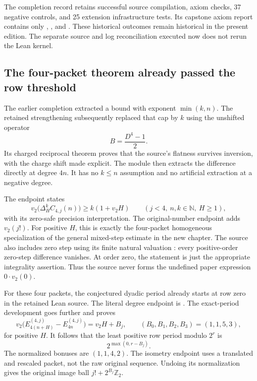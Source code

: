 The completion record retains successful source compilation, axiom checks, 37 negative controls, and 25 extension infrastructure tests. Its capstone axiom report contains only , , and . These historical outcomes remain historical in the present edition. The separate source and log reconciliation executed now does not rerun the Lean kernel.

\subsection{The four-packet theorem already passed the row threshold}
The earlier completion extracted a bound with exponent $\min(k,n)$. The retained strengthening subsequently replaced that cap by $k$ using the unshifted operator
\[
 B=\frac{D^4-1}{2}.
\]
Its charged reciprocal theorem proves that the source's flatness survives inversion, with the charge shift made explicit. The module  then extracts the difference directly at degree $4n$. It has no $k\le n$ assumption and no artificial extraction at a negative degree.

The endpoint  states
\[
 v_2\bigl(\Delta_H^k C_{4,j}(n)\bigr)\ge k(1+v_2H)
 \qquad(j<4,\ n,k\in\mathbb N,\ H\ge1),
\]
with its zero-safe precision interpretation. The original-number endpoint adds $v_2(j!)$. For positive $H$, this is exactly the four-packet homogeneous specialization of the general mixed-step estimate in the new chapter. The source also includes zero step using its finite natural valuation : every positive-order zero-step difference vanishes. At order zero, the statement is just the appropriate integrality assertion. Thus the source never forms the undefined paper expression $0\cdot v_2(0)$.

For these four packets, the conjectured dyadic period already starts at row zero in the retained Lean source. The literal degree endpoint is . The exact-period development goes further and proves
\[
 v_2\bigl(E_{4(n+H)}^{(4,j)}-E_{4n}^{(4,j)}\bigr)
   =v_2H+B_j,\qquad (B_0,B_1,B_2,B_3)=(1,1,5,3),
\]
for positive $H$. It follows that the least positive row period modulo $2^r$ is
\[
 2^{\max(0,r-B_j)}.
\]
The normalized bonuses are $(1,1,4,2)$. The isometry endpoint uses a translated and rescaled packet, not the raw original sequence. Undoing its normalization gives the original image ball $j!+2^{B_j}\mathbb Z_2$.

